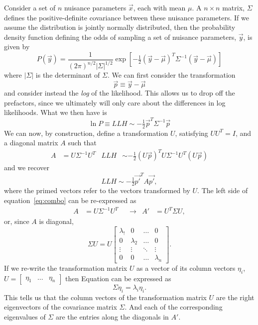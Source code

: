 \documentclass[12pt,a4paper]{article}
\newcommand{\abs}[1]{\left| #1 \right|}
\begin{document}
Consider a set of $n$ nuisance parameters $\vec{x}$, each with mean $\mu$.
A $n\times n$ matrix, $\Sigma$ defines the positive-definite covariance between these nuisance parameters. 
If we assume the distribution is jointly normally distributed, then the probability density function defining the odds of sampling a set of nuisance parameters, $\vec{y}$, is given by
\begin{equation}
    P(\vec{y}) = \dfrac{1}{(2\pi)^{n/2}\abs{\Sigma}^{1/2}}\exp\left[-\tfrac{1}{2}(\vec{y}-\vec{\mu})^{T}\Sigma^{-1}\left(\vec{y}-\vec{\mu}\right)\right]
\end{equation}
where $\abs{\Sigma}$ is the determinant of $\Sigma$. We can first consider the transformation 
\begin{equation}
    \vec{p}\equiv \vec{y}-\vec{\mu}
\end{equation}
and consider instead the \textit{log} of the likelihood.
This allows us to drop off the prefactors, since we ultimately will only care about the differences in log likelihoods.
What we then have is 
\begin{equation}
    \ln P \equiv LLH \sim -\tfrac{1}{2}\vec{p}^{T}\Sigma^{-1}\vec{p}
\end{equation}
We can now, by construction, define a transformation $U$, satisfying $UU^{T}=I$, and a diagonal matrix $A$ such that 
\begin{align}\label{eq:combo}
    A&=U\Sigma^{-1}U^{T} & LLH &\sim -\tfrac{1}{2}(U\vec{p})^{T} U\Sigma^{-1}U^{T}(U \vec{p})
\end{align}
and we recover
\begin{equation}
    LLH \sim -\tfrac{1}{2}\vec{p'}^{T} A\vec{p'},
\end{equation}
where the primed vectors refer to the vectors transformed by $U$. The left side of equation~\eqref{eq:combo} can be re-expressed as 
\begin{align}
    A&=U\Sigma^{-1}U^{T} &  &\to & A' &= U^{T}\Sigma U,
\end{align}
or, since $A$ is diagonal,
\begin{equation}\label{eq:mat}
\Sigma U = U\left[ \begin{array}{cccc}\lambda_{!} & 0 & \ldots & 0 \\
0 & \lambda_{2} & \ldots & 0 \\
\vdots & \vdots & \ddots & \vdots \\
0 & 0 & \ldots & \lambda_{n} \end{array}\right].
\end{equation}
If we re-write the transformation matrix $U$ as a vector of its column vectors $\eta_{i}$, $U=\left[\begin{array}{ccc}\eta_{1} & \ldots & \eta_{n} \end{array}\right]$ then Equation can be expressed as 
\begin{equation}
\Sigma \eta_{i} = \lambda_{i}\eta_{i}.
\end{equation}
This tells us that the column vectors of the transformation matrix $U$ are the right eigenvectors of the covariance matrix $\Sigma$. 
And each of the corresponding eigenvalues of $\Sigma$ are the entries along the diagonals in $A'$.
\end{document}
